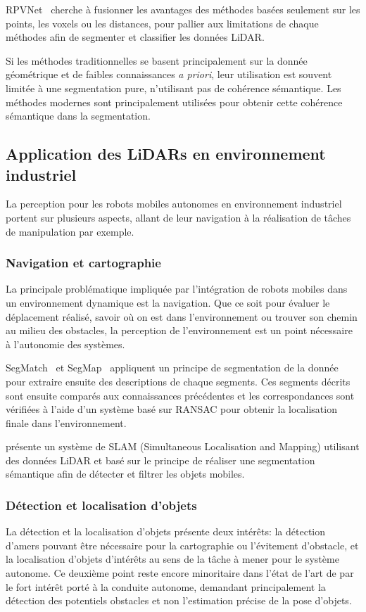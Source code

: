 \documentclass[a4paper, french, 10pt, onecolumn, notitlepage, roman]{article}
\begin{document}
RPVNet~\cite{xu:arxiv:2021} cherche à fusionner les avantages des méthodes basées seulement sur les points, les voxels ou les distances, pour pallier aux limitations de chaque méthodes afin de segmenter et classifier les données LiDAR.

Si les méthodes traditionnelles se basent principalement sur la donnée géométrique et de faibles connaissances \emph{a priori}, leur utilisation est souvent limitée à une segmentation pure, n'utilisant pas de cohérence sémantique.
Les méthodes modernes sont principalement utilisées pour obtenir cette cohérence sémantique dans la segmentation.

\subsection{Application des LiDARs en environnement industriel}

La perception pour les robots mobiles autonomes en environnement industriel portent sur plusieurs aspects, allant de leur navigation à la réalisation de tâches de manipulation par exemple.

\subsubsection{Navigation et cartographie}
La principale problématique impliquée par l'intégration de robots mobiles dans un environnement dynamique est la navigation.
Que ce soit pour évaluer le déplacement réalisé, savoir où on est dans l'environnement ou trouver son chemin au milieu des obstacles, la perception de l'environnement est un point nécessaire à l'autonomie des systèmes.

SegMatch~\cite{dube:icra:2017} et SegMap~\cite{dube:rss:2018} appliquent un principe de segmentation de la donnée pour extraire ensuite des descriptions de chaque segments.
Ces segments décrits sont ensuite comparés aux connaissances précédentes et les correspondances sont vérifiées à l'aide d'un système basé sur RANSAC pour obtenir la localisation finale dans l'environnement.

\cite{wang:eecr:2023} présente un système de SLAM (Simultaneous Localisation and Mapping) utilisant des données LiDAR et basé sur le principe de réaliser une segmentation sémantique afin de détecter et filtrer les objets mobiles.


\subsubsection{Détection et localisation d'objets}
La détection et la localisation d'objets présente deux intérêts: la détection d'amers pouvant être nécessaire pour la cartographie ou l'évitement d'obstacle, et la localisation d'objets d'intérêts au sens de la tâche à mener pour le système autonome.
Ce deuxième point reste encore minoritaire dans l'état de l'art de par le fort intérêt porté à la conduite autonome, demandant principalement la détection des potentiels obstacles et non l'estimation précise de la pose d'objets.
\end{document}
